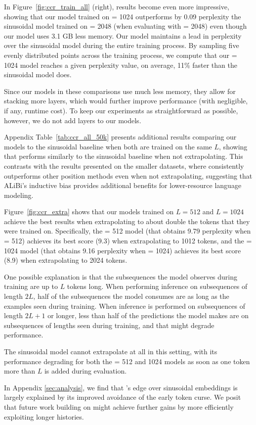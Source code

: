 In Figure~\ref{fig:ccr_train_all} (right), results become even more impressive, showing that our model trained on \lt = 1024 outperforms by 0.09 perplexity the sinusoidal model trained on \lt = 2048 (when evaluating with \li = 2048) even though our model uses 3.1 GB less memory. Our model maintains a lead in perplexity over the sinusoidal model during the entire training process. By sampling five evenly distributed points across the training process, we compute that our \lt = 1024 model reaches a given perplexity value, on average, 11\% faster than the sinusoidal model does. 

Since our models in these comparisons use much less memory, they allow for stacking more layers, which would further improve performance (with negligible, if any, runtime cost). To keep our experiments as straightforward as possible, however, we do not add layers to our models.

Appendix Table~\ref{tab:ccr_all_50k} presents additional results comparing our models to the sinusoidal baseline when both are trained on the same $L$, showing that \al performs similarly to the sinusoidal baseline when not extrapolating. This contrasts with the  results presented on the smaller datasets, where \al consistently outperforms other position methods even when not extrapolating, suggesting that ALiBi's inductive bias provides additional benefits for lower-resource language modeling.




Figure~\ref{fig:ccr_extra} shows that our models trained on $L=512$ and $L=1024$ achieve the best results when extrapolating to about double the tokens that they were trained on.
Specifically, the \lt = 512 model (that obtains 9.79 perplexity when \li = 512) achieves its best score (9.3) when extrapolating to 1012 tokens, and the \lt = 1024 model (that obtains 9.16 perplexity when \li = 1024) achieves its best score (8.9) when extrapolating to 2024 tokens. 


One possible explanation is that the subsequences the model observes during training are up to $L$ tokens long. When performing inference on subsequences of length $2L$, half of the subsequences the model consumes are as long as the examples seen during training. When inference is performed on subsequences of length $2L+1$ or longer, less than half of the predictions the model makes are on subsequences of lengths seen during training, and that might degrade performance. 

The sinusoidal model cannot extrapolate at all in this setting, with its performance degrading for both the \lt = 512 and 1024 models as soon as one token more than $L$ is added during evaluation. 


In Appendix \ref{sec:analysis}, we find that \al's  edge over sinusoidal embeddings is largely explained by its improved avoidance of the early token curse.  We posit  that future work building on \al might achieve further gains by more efficiently  exploiting longer histories.

